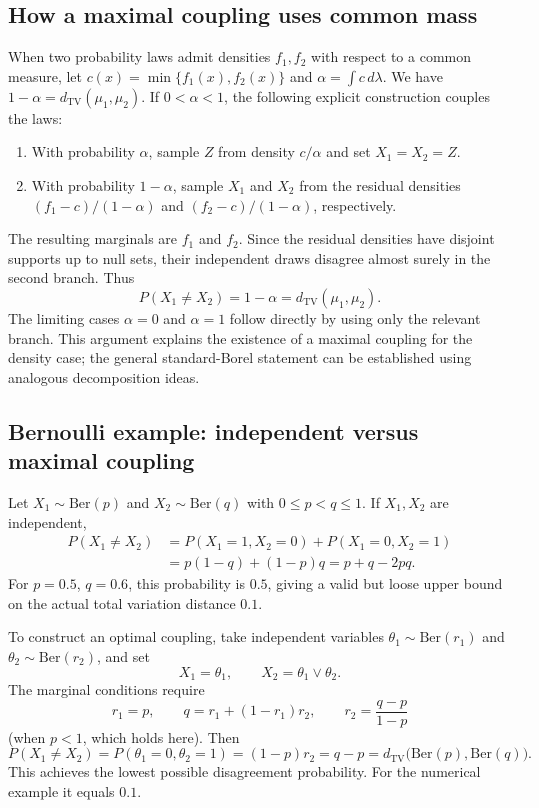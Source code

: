\documentclass[10pt,a4paper]{article}
\newcommand{\TV}{d_{\mathrm{TV}}}
\begin{document}
\subsection*{How a maximal coupling uses common mass}
When two probability laws admit densities $f_1,f_2$ with respect to a common measure, let $c(x)=\min\{f_1(x),f_2(x)\}$ and $\alpha=\int c\,d\lambda$. We have $1-\alpha=\TV(\mu_1,\mu_2)$. If $0<\alpha<1$, the following explicit construction couples the laws:
\begin{enumerate}[leftmargin=*,label=(\roman*)]
\item With probability $\alpha$, sample $Z$ from density $c/\alpha$ and set $X_1=X_2=Z$.
\item With probability $1-\alpha$, sample $X_1$ and $X_2$ from the residual densities $(f_1-c)/(1-\alpha)$ and $(f_2-c)/(1-\alpha)$, respectively.
\end{enumerate}
The resulting marginals are $f_1$ and $f_2$. Since the residual densities have disjoint supports up to null sets, their independent draws disagree almost surely in the second branch. Thus
\[
P(X_1\ne X_2)=1-\alpha=\TV(\mu_1,\mu_2).
\]
The limiting cases $\alpha=0$ and $\alpha=1$ follow directly by using only the relevant branch. This argument explains the existence of a maximal coupling for the density case; the general standard-Borel statement can be established using analogous decomposition ideas.

\subsection*{Bernoulli example: independent versus maximal coupling}
Let $X_1\sim\mathrm{Ber}(p)$ and $X_2\sim\mathrm{Ber}(q)$ with $0\le p<q\le1$. If $X_1,X_2$ are independent,
\begin{align*}
P(X_1\ne X_2)
&=P(X_1=1,X_2=0)+P(X_1=0,X_2=1)\\
&=p(1-q)+(1-p)q=p+q-2pq.
\end{align*}
For $p=0.5$, $q=0.6$, this probability is $0.5$, giving a valid but loose upper bound on the actual total variation distance $0.1$.

To construct an optimal coupling, take independent variables $\theta_1\sim\mathrm{Ber}(r_1)$ and $\theta_2\sim\mathrm{Ber}(r_2)$, and set
\[
X_1=\theta_1,\qquad X_2=\theta_1\vee\theta_2.
\]
The marginal conditions require
\[
r_1=p,\qquad q=r_1+(1-r_1)r_2,
\qquad r_2=\frac{q-p}{1-p}
\]
(when $p<1$, which holds here). Then
\[
P(X_1\ne X_2)=P(\theta_1=0,\theta_2=1)
=(1-p)r_2=q-p=\TV\bigl(\mathrm{Ber}(p),\mathrm{Ber}(q)\bigr).
\]
This achieves the lowest possible disagreement probability. For the numerical example it equals $0.1$.
\end{document}

